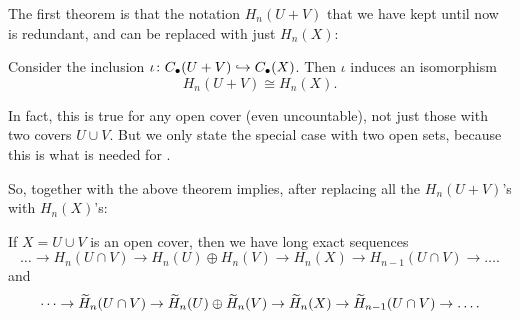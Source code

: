 The first theorem is that the notation $H_n(U+V)$ that we have kept until now
is redundant, and can be replaced with just $H_n(X)$:
\begin{theorem}
	\label{thm:open_cover_homology}
	Consider the inclusion $\iota \colon C_\bullet(U+V) \hookrightarrow C_\bullet(X)$.
	Then $\iota$ induces an isomorphism
	\[ H_n(U+V) \cong H_n(X). \]
\end{theorem}
\begin{remark}
	In fact, this is true for any open cover (even uncountable),
	not just those with two covers $U \cup V$.
	But we only state the special case with two open sets,
	because this is what is needed for .
\end{remark}
So,  together with the above theorem implies,
after replacing all the $H_n(U+V)$'s with $H_n(X)$'s:
\begin{theorem}
	If $X = U \cup V$ is an open cover, then we have long exact sequences
	\[ \dots \to H_n(U \cap V) \to H_n(U) \oplus H_n(V)
		\to H_n(X) \to H_{n-1}(U \cap V) \to \dots. \]
	and
	\[ \dots \to \widetilde H_n(U \cap V) \to \widetilde H_n(U) \oplus \widetilde H_n(V) \to
		\widetilde H_n(X) \to \widetilde H_{n-1}(U \cap V) \to \dots. \]
\end{theorem}

